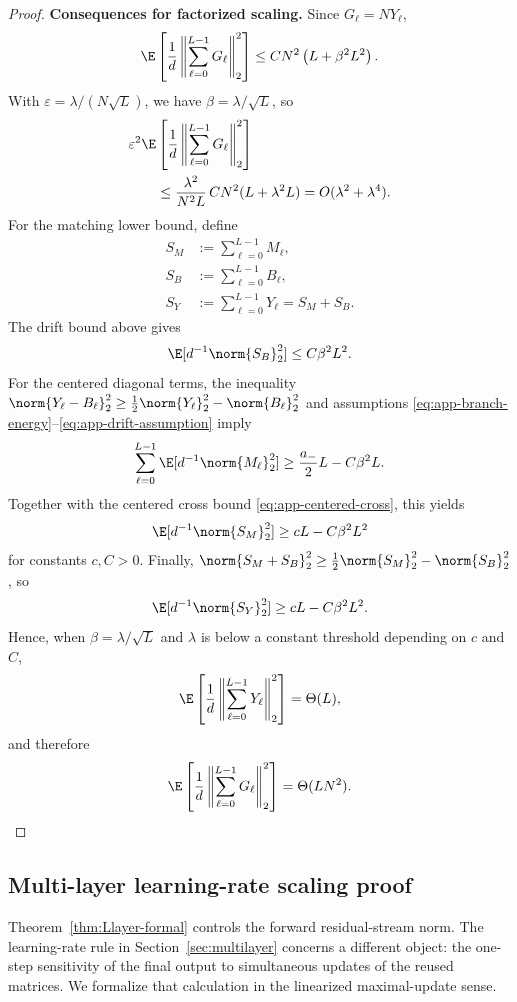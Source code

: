 \begin{proof}
\smallskip
\noindent\textbf{Consequences for factorized scaling.}
Since $G_\ell=NY_\ell$,
\[
  \E\left[
  \frac{1}{d}
  \left\|
  \sum_{\ell=0}^{L-1}G_\ell
  \right\|_2^2
  \right]
  \le
  C N^2\left(L+\beta^2L^2\right).
\]
With $\varepsilon=\lambda/(N\sqrt L)$, we have $\beta=\lambda/\sqrt L$, so
\[
  \begin{aligned}
  &\varepsilon^2
  \E\left[
    \frac{1}{d}
    \left\|\sum_{\ell=0}^{L-1}G_\ell\right\|_2^2
  \right]\\
  &\qquad\le
  \frac{\lambda^2}{N^2L}\,C N^2(L+\lambda^2L)
  =
  O(\lambda^2+\lambda^4).
  \end{aligned}
\]
For the matching lower bound, define
\[
  \begin{aligned}
  S_M&:=\sum_{\ell=0}^{L-1}M_\ell,\\
  S_B&:=\sum_{\ell=0}^{L-1}B_\ell,\\
  S_Y&:=\sum_{\ell=0}^{L-1}Y_\ell=S_M+S_B.
  \end{aligned}
\]
The drift bound above gives
\[
  \E[d^{-1}\norm{S_B}_2^2]\le C\beta^2L^2.
\]
For the centered diagonal terms, the inequality
$\norm{Y_\ell-B_\ell}_2^2\ge \frac12\norm{Y_\ell}_2^2-\norm{B_\ell}_2^2$
and assumptions \eqref{eq:app-branch-energy}--\eqref{eq:app-drift-assumption} imply
\[
  \sum_{\ell=0}^{L-1}\E[d^{-1}\norm{M_\ell}_2^2]
  \ge
  \frac{a_-}{2}L-C\beta^2L.
\]
Together with the centered cross bound \eqref{eq:app-centered-cross}, this yields
\[
  \E[d^{-1}\norm{S_M}_2^2]
  \ge
  cL-C\beta^2L^2
\]
for constants $c,C>0$. Finally,
$\norm{S_M+S_B}_2^2\ge \frac12\norm{S_M}_2^2-\norm{S_B}_2^2$, so
\[
  \E[d^{-1}\norm{S_Y}_2^2]
  \ge
  cL-C\beta^2L^2.
\]
Hence, when $\beta=\lambda/\sqrt L$ and $\lambda$ is below a constant threshold depending on $c$ and $C$,
\[
  \E\left[
  \frac{1}{d}
  \left\|
  \sum_{\ell=0}^{L-1}Y_\ell
  \right\|_2^2
  \right]
  =
  \Theta(L),
\]
and therefore
\[
  \E\left[\frac{1}{d}\left\|\sum_{\ell=0}^{L-1} G_\ell\right\|_2^2\right]
  =
  \Theta(LN^2).
\]
\end{proof}

\subsection{Multi-layer learning-rate scaling proof}
\label{app:Llayer-lr}

Theorem~\ref{thm:Llayer-formal} controls the forward residual-stream norm.
The learning-rate rule in Section~\ref{sec:multilayer} concerns a different object: the one-step sensitivity of the final output to simultaneous updates of the reused matrices.
We formalize that calculation in the linearized maximal-update sense.

